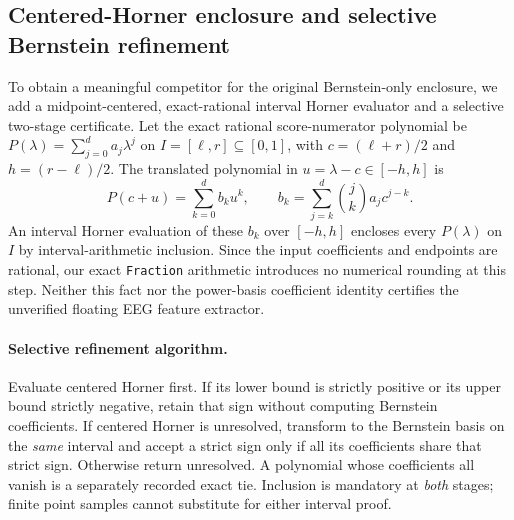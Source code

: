 \subsection{Centered-Horner enclosure and selective Bernstein refinement}
\label{sec:p4-selective-hybrid-proof}
To obtain a meaningful competitor for the original
Bernstein-only enclosure, we add a midpoint-centered,
exact-rational interval Horner evaluator and a selective
two-stage certificate. Let the exact rational score-numerator
polynomial be $P(\lambda)=\sum_{j=0}^d a_j\lambda^j$
on $I=[\ell,r]\subseteq[0,1]$, with
$c=(\ell+r)/2$ and $h=(r-\ell)/2$. The translated
polynomial in $u=\lambda-c\in[-h,h]$ is
\[
P(c+u)=\sum_{k=0}^d b_k u^k,\qquad
b_k=\sum_{j=k}^d \binom{j}{k}a_jc^{j-k}.
\]
An interval Horner evaluation of these $b_k$
over $[-h,h]$ encloses every $P(\lambda)$ on $I$
by interval-arithmetic inclusion. Since the input
coefficients and endpoints are rational, our exact
\texttt{Fraction} arithmetic introduces no numerical
rounding at this step. Neither this fact nor
the power-basis coefficient identity certifies
the unverified floating EEG feature extractor.

\paragraph{Selective refinement algorithm.}
Evaluate centered Horner first. If its lower bound is
strictly positive or its upper bound strictly negative,
retain that sign without computing Bernstein
coefficients. If centered Horner is unresolved,
transform to the Bernstein basis on the \emph{same}
interval and accept a strict sign only if all its
coefficients share that strict sign. Otherwise
return unresolved. A polynomial whose coefficients
all vanish is a separately recorded exact tie.
Inclusion is mandatory at \emph{both}
stages; finite point samples cannot substitute
for either interval proof.

